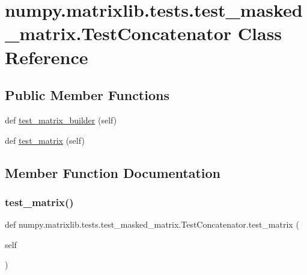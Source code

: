 \hypertarget{classnumpy_1_1matrixlib_1_1tests_1_1test__masked__matrix_1_1TestConcatenator}{}\section{numpy.\+matrixlib.\+tests.\+test\+\_\+masked\+\_\+matrix.\+Test\+Concatenator Class Reference}
\label{classnumpy_1_1matrixlib_1_1tests_1_1test__masked__matrix_1_1TestConcatenator}
\subsection*{Public Member Functions}
\begin{DoxyCompactItemize}
\item 
def \hyperlink{classnumpy_1_1matrixlib_1_1tests_1_1test__masked__matrix_1_1TestConcatenator_a66d880b3ed047171ce84f44ae5db231d}{test\+\_\+matrix\+\_\+builder} (self)
\item 
def \hyperlink{classnumpy_1_1matrixlib_1_1tests_1_1test__masked__matrix_1_1TestConcatenator_ab206f9aa03d7d0179bc70ef48205497d}{test\+\_\+matrix} (self)
\end{DoxyCompactItemize}


\subsection{Member Function Documentation}
\mbox{\label{classnumpy_1_1matrixlib_1_1tests_1_1test__masked__matrix_1_1TestConcatenator_ab206f9aa03d7d0179bc70ef48205497d}} 
\subsubsection{\texorpdfstring{test\+\_\+matrix()}{test\_matrix()}}
{\footnotesize\ttfamily def numpy.\+matrixlib.\+tests.\+test\+\_\+masked\+\_\+matrix.\+Test\+Concatenator.\+test\+\_\+matrix (\begin{DoxyParamCaption}\item[{}]{self }\end{DoxyParamCaption})}


